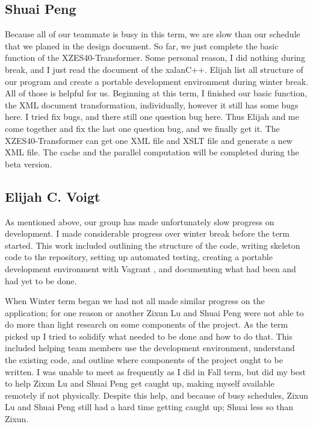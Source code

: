 \subsection{Shuai Peng}

Because all of our teammate is busy in this term, we are slow than our schedule that we planed in the design document. 
So far, we just complete the basic function of the XZES40-Transformer.
Some personal reason, I did nothing during break, and I just read the document of the xalanC++.
Elijah list all structure of our program and create a portable development environment during winter break. 
All of those is helpful for us.
Beginning at this term, I finished our basic function, the XML document transformation, individually, however it still has some bugs here.
I tried fix bugs, and there still one question bug here.
Thus Elijah and me come together and fix the last one question bug, and we finally get it.
The XZES40-Transformer can get one XML file and XSLT file and generate a new XML file.
The cache and the parallel computation will be completed during the beta version.

\subsection{Elijah C. Voigt}

As mentioned above, our group has made unfortunately slow progress on development.
I made considerable progress over winter break before the term started.
This work included outlining the structure of the code, writing skeleton code to the repository, setting up automated testing, creating a portable development environment with Vagrant \cite{vagrant}, and documenting what had been and had yet to be done.

When Winter term began we had not all made similar progress on the application; for one reason or another Zixun Lu and Shuai Peng were not able to do more than light research on some components of the project.
As the term picked up I tried to solidify what needed to be done and how to do that.
This included helping team members use the development environment, understand the existing code, and outline where components of the project ought to be written.
I was unable to meet as frequently as I did in Fall term, but did my best to help Zixun Lu and Shuai Peng get caught up, making myself available remotely if not physically.
Despite this help, and because of busy schedules, Zixun Lu and Shuai Peng still had a hard time getting caught up; Shuai less so than Zixun.

